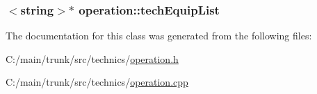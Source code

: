 \label{classoperation_a0dfdfa94be6ba40de784c3bf2be860f6}
\hypertarget{classoperation_a4924dc23ecc7f5f2cdd46fd37a4477b2}{
\subsubsection[{techEquipList}]{$<$string$>$$\ast$ {\bf operation::techEquipList}}}
\label{classoperation_a4924dc23ecc7f5f2cdd46fd37a4477b2}


The documentation for this class was generated from the following files:\begin{DoxyCompactItemize}
\item 
C:/main/trunk/src/technics/\hyperlink{operation_8h}{operation.h}\item 
C:/main/trunk/src/technics/\hyperlink{operation_8cpp}{operation.cpp}\end{DoxyCompactItemize}
